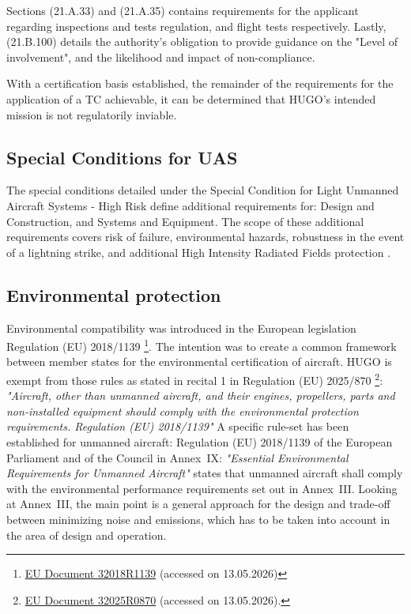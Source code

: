 Sections (21.A.33) and (21.A.35) contains requirements for the applicant regarding inspections and tests regulation, and flight tests respectively. Lastly, (21.B.100) details the authority's obligation to provide guidance on the "Level of involvement", and the likelihood and impact of non-compliance. 

With a certification basis established, the remainder of the requirements for the application of a TC achievable, it can be determined that HUGO's intended mission is not regulatorily inviable.

\subsection{Special Conditions for UAS}
\label{sec: special conditions}
The special conditions detailed under the Special Condition for Light Unmanned Aircraft Systems - High Risk define additional requirements for: Design and Construction, and Systems and Equipment. The scope of these additional requirements covers risk of failure, environmental hazards, robustness in the event of a lightning strike, and additional High Intensity Radiated Fields protection \cite{easa_light_uas_crd_is3}.

\subsection{Environmental protection}
\label{subsec:environmental_protection}
Environmental compatibility was introduced in the European legislation Regulation (EU) 2018/1139 \footnote{\label{doc_1139}\href{https://eur-lex.europa.eu/eli/reg/2018/1139/oj/eng}{EU Document 32018R1139} (accessed on 13.05.2026)}. The intention was to create a common framework between member states for the environmental certification of aircraft. HUGO is exempt from those rules as stated in recital 1 in Regulation (EU) 2025/870 \footnote{\href{https://eur-lex.europa.eu/legal-content/EN/TXT/?uri=CELEX\%3A32025R0870}{EU Document 32025R0870} (accessed on 13.05.2026).}: \textit{"Aircraft, other than unmanned aircraft, and their engines, propellers, parts and non-installed equipment should comply with the environmental protection requirements. Regulation (EU) 2018/1139"}
A specific rule-set has been established for unmanned aircraft: Regulation (EU) 2018/1139  of the European Parliament and of the Council in Annex~IX: \textit{"Essential Environmental Requirements for Unmanned Aircraft"} states that unmanned aircraft shall comply with the environmental performance requirements set out in Annex~III.
Looking at Annex~III, the main point is a general approach for the design and trade-off between minimizing noise and emissions, which has to be taken into account in the area of design and operation. 



